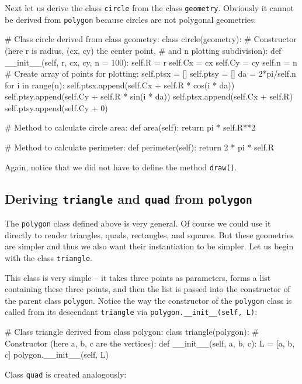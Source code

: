 Next let us derive the class {\tt circle} from the class {\tt geometry}. Obviously it cannot be derived
from {\tt polygon} because circles are not polygonal geometries:

\begin{bluecode}
# Class circle derived from class geometry:
class circle(geometry):
    # Constructor (here r is radius, (cx, cy) the center point,
    # and n plotting subdivision):
    def __init__(self, r, cx, cy, n = 100):
        self.R = r
        self.Cx = cx
        self.Cy = cy
        self.n = n
        # Create array of points for plotting:
        self.ptsx = []
        self.ptsy = []
        da = 2*pi/self.n
        for i in range(n):
            self.ptsx.append(self.Cx + self.R * cos(i * da))
            self.ptsy.append(self.Cy + self.R * sin(i * da))
        self.ptsx.append(self.Cx + self.R)
        self.ptsy.append(self.Cy + 0)
            
    # Method to calculate circle area:
    def area(self):
        return pi * self.R**2
      
    # Method to calculate perimeter:
    def perimeter(self):
        return 2 * pi * self.R
\end{bluecode}
Again, notice that we did not have to define the method {\tt draw()}.

\subsection{Deriving {\tt triangle} and {\tt quad} from {\tt polygon}}

The {\tt polygon} class defined above is very general. Of course we could use 
it directly to render triangles, quads, rectangles, and squares. But these 
geometries are simpler and thus we also want their instantiation to be simpler.  
Let us begin with the class {\tt triangle}. 

This class is very simple -- it takes three points as parameters, forms 
a list containing these three points, and then the list is passed into the 
constructor of the parent class {\tt polygon}. Notice the way the constructor of
the {\tt polygon} class is called from its descendant {\tt triangle} via 
{\tt polygon.\_\_init\_\_(self, L)}:

\begin{bluecode}
# Class triangle derived from class polygon:
class triangle(polygon):
    # Constructor (here a, b, c are the vertices):
    def __init__(self, a, b, c):
        L = [a, b, c]
        polygon.__init__(self, L)
\end{bluecode}
Class {\tt quad} is created analogously:

